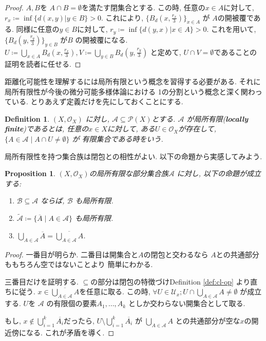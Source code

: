 \documentclass[lualatex]{ltjsbook}
\newcommand{\cl}[1]{\overline{ #1}  }
\newtheorem{definition}[theorem]{Definition}
\newtheorem{proposition}[theorem]{Proposition}
\theoremstyle{remark}
\theoremstyle{plain}
\begin{document}
\begin{proof}
  $A,B$を $A \cap B = \emptyset$を満たす閉集合とする. この時, 任意の$x \in A$に対して, 
  $r_x \coloneqq \inf \{d(x,y) | y \in B\} >0 $. これにより, $\{B_d(x, \frac{r_x}{3})\}_{x \in A} $ が
  $A$の開被覆である.  同様に任意の$y \in B$に対して, $r_y \coloneqq \inf \{d(y,x) | x\in A\} >0$. 
  これを用いて, $\{B_d(y,\frac{r_y}{3})\} _{y \in B}$ が$B$ の開被覆になる. 
  $U \coloneqq \bigcup_{x \in A}B_d(x, \frac{r_x}{3}), V \coloneqq \bigcup_{y \in B}B_d(y , \frac{r_y}{3})  $ と定めて, 
  $U \cap V = \emptyset$であることの証明を読者に任せる. 
\end{proof}

距離化可能性を理解するには局所有限という概念を習得する必要がある. それに局所有限性が今後の微分可能多様体論における
1の分割という概念と深く関わっている. とりあえず定義だけを先にしておくことにする. 

\begin{definition}
  $\left( X , \mathcal{O}_{X} \right)$ に対し, $\mathcal{A} \subseteq \mathcal{P}(X)$とする. 
  $\mathcal{A}$ が局所有限(\textbf{locally finite})であるとは, 任意の$x \in X$に対して, 
  ある$U \in \mathcal{O}_X$が存在して, $\{A \in \mathcal{A} \mid A \cap U \neq \emptyset\} $ が
  有限集合である時をいう.
\end{definition}

局所有限性を持つ集合族は閉包との相性がよい. 以下の命題から実感してみよう. 

\begin{proposition}
   $\left( X , \mathcal{O}_{X} \right)$の局所有限な部分集合族$\mathcal{A}$ に対し, 
   以下の命題が成立する: 
   \begin{enumerate}
     \item $\mathcal{B} \subseteq \mathcal{A}$ ならば, $\mathcal{B}$ も局所有限.
     \item $\tilde{\mathcal{A}} \coloneqq \{\cl{A}  \mid  A \in \mathcal{A}\} $ も局所有限.
     \item $\bigcup_{A \in \mathcal{A}}\cl{A}  = \cl{\bigcup_{A \in \mathcal{A}} A} $.
   \end{enumerate}
\end{proposition}

\begin{proof}
  一番目が明らか. 二番目は開集合と$A$の閉包と交わるなら $A$との共通部分ももちろん空ではないことより
  簡単にわかる. 
  
  三番目だけを証明する. $\subseteq $の部分は閉包の特徴づけDefinition \ref{def:cl-op} より直ちに従う. 
  $x \in \cl{\bigcup_{A \in \mathcal{A}} A}$を任意に取る. この時, $\forall U \in \mathcal{U}_x; U \cap \bigcup_{A \in \mathcal{A}} A \neq \emptyset$
  が成立する. $U$を $\mathcal{A}$ の有限個の要素$A_1,\ldots, A_k $ としか交わらない開集合として取る. 

  もし, $x \not\in  \bigcup_{i=1} ^k \cl{A_i} $だったら, $U \setminus \bigcup_{i=1}^k \cl{A_i} $ が
   $\bigcup_{A \in \mathcal{A}} A  $ との共通部分が空な$x$の開近傍になる. これが矛盾を導く. 
\end{proof}
\end{document}
